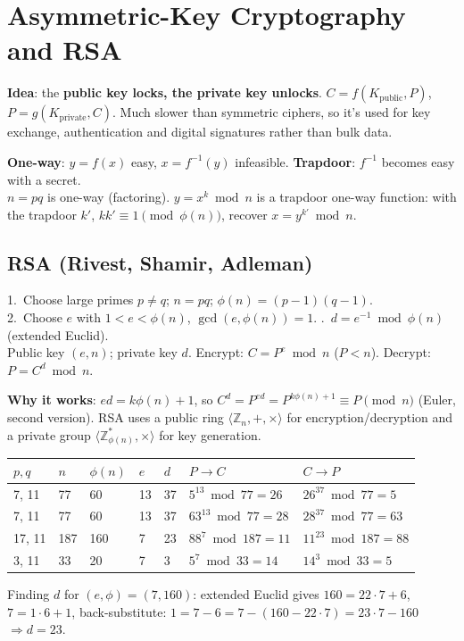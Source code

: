 \section{Asymmetric-Key Cryptography and RSA}

\textbf{Idea}: the \textbf{public key locks, the private key unlocks}. $C = f(K_{\text{public}}, P)$, $P = g(K_{\text{private}}, C)$. Much slower than symmetric ciphers, so it's used for key exchange, authentication and digital signatures rather than bulk data.

\begin{keybox}[title=Trapdoor one-way function]
\textbf{One-way}: $y = f(x)$ easy, $x = f^{-1}(y)$ infeasible. \textbf{Trapdoor}: $f^{-1}$ becomes easy with a secret.\\
$n = pq$ is one-way (factoring). $y = x^k \bmod n$ is a trapdoor one-way function: with the trapdoor $k'$, $kk' \equiv 1 \pmod{\phi(n)}$, recover $x = y^{k'} \bmod n$.
\end{keybox}

\subsection{RSA (Rivest, Shamir, Adleman)}
\begin{keybox}[title={Key generation, encryption, decryption}]
1.\ Choose large primes $p \ne q$; \;$n = pq$; \;$\phi(n) = (p - 1)(q - 1)$.\\
2.\ Choose $e$ with $1 < e < \phi(n)$, $\gcd(e, \phi(n)) = 1$. .\ $d = e^{-1} \bmod \phi(n)$ (extended Euclid).\\
Public key $(e, n)$; private key $d$.
\qquad Encrypt: $C = P^e \bmod n$ \;($P < n$). \qquad Decrypt: $P = C^d \bmod n$.
\end{keybox}
\textbf{Why it works}: $ed = k\phi(n) + 1$, so $C^d = P^{ed} = P^{k\phi(n)+1} \equiv P \pmod n$ (Euler, second version). RSA uses a public ring $\langle \mathbb{Z}_n, +, \times\rangle$ for encryption/decryption and a private group $\langle \mathbb{Z}_{\phi(n)}^*, \times\rangle$ for key generation.

\begin{center}\small
\begin{tabular}{@{}lllllll@{}}
\toprule
$p, q$ & $n$ & $\phi(n)$ & $e$ & $d$ & $P \to C$ & $C \to P$\\
\midrule
7, 11 & 77 & 60 & 13 & 37 & $5^{13} \bmod 77 = 26$ & $26^{37} \bmod 77 = 5$\\
7, 11 & 77 & 60 & 13 & 37 & $63^{13} \bmod 77 = 28$ & $28^{37} \bmod 77 = 63$\\
17, 11 & 187 & 160 & 7 & 23 & $88^{7} \bmod 187 = 11$ & $11^{23} \bmod 187 = 88$\\
3, 11 & 33 & 20 & 7 & 3 & $5^7 \bmod 33 = 14$ & $14^3 \bmod 33 = 5$\\
\bottomrule
\end{tabular}
\end{center}
Finding $d$ for $(e, \phi) = (7, 160)$: extended Euclid gives $160 = 22\cdot7 + 6$, $7 = 1\cdot6 + 1$, back-substitute: $1 = 7 - 6 = 7 - (160 - 22\cdot7) = 23\cdot7 - 160$ $\Rightarrow d = 23$.


